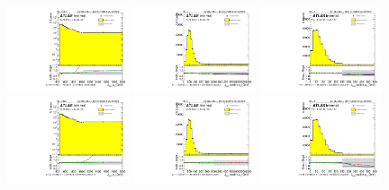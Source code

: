 \begin{figure}[htbp!]
\begin{center}
\includegraphics[width=0.32\textwidth,angle=-90]{figures/boosted/Reweight/Fits/Moriond_bkg_3_NoTag_3Trk_subl_Incl_leadHCand_Pt_m_1.pdf}
\includegraphics[width=0.32\textwidth,angle=-90]{figures/boosted/Reweight/Fits/Moriond_bkg_3_NoTag_3Trk_subl_Incl_leadHCand_trk0_Pt.pdf}
\includegraphics[width=0.32\textwidth,angle=-90]{figures/boosted/Reweight/Fits/Moriond_bkg_3_NoTag_3Trk_subl_Incl_leadHCand_trk1_Pt.pdf} \\
\includegraphics[width=0.32\textwidth,angle=-90]{figures/boosted/Reweight/Fits/Moriond_bkg_9_NoTag_3Trk_subl_Incl_leadHCand_Pt_m_1.pdf}
\includegraphics[width=0.32\textwidth,angle=-90]{figures/boosted/Reweight/Fits/Moriond_bkg_9_NoTag_3Trk_subl_Incl_leadHCand_trk0_Pt.pdf}
\includegraphics[width=0.32\textwidth,angle=-90]{figures/boosted/Reweight/Fits/Moriond_bkg_9_NoTag_3Trk_subl_Incl_leadHCand_trk1_Pt.pdf} \\

\end{center}
\end{figure}
